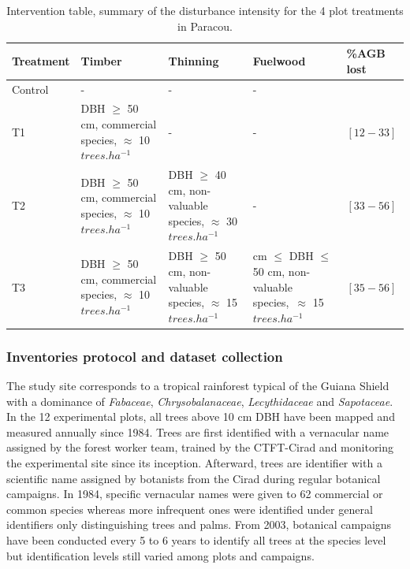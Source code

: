 \documentclass[
  11pt,
  french,
  A4paper,
  extrafontsizes,onecolumn,openright
  ]{memoir}
\begin{document}
\begin{longtable}[t]{>{\raggedright\arraybackslash}p{5em}|>{\raggedright\arraybackslash}p{8em}|>{\raggedright\arraybackslash}p{8em}|>{\raggedright\arraybackslash}p{11em}|>{\raggedright\arraybackslash}p{4em}}
\caption{\label{tab:Tab1}Intervention table, summary of the disturbance intensity for the 4 plot treatments in Paracou.}\\
\hline
Treatment & Timber & Thinning & Fuelwood & \%AGB lost\\
\hline
Control & - & - & - & 0\\
\hline
T1 & DBH $\geq$ 50 cm, commercial species, $\approx$ 10   $trees.ha^{-1}$ & - & - & $[12-33]$\\
\hline
T2 & DBH $\geq$ 50 cm, commercial species, $\approx$ 10  $trees.ha^{-1}$ & DBH $\geq$ 40 cm, non-valuable species, $\approx$ 30   $trees.ha^{-1}$ & - & $[33-56]$\\
\hline
T3 & DBH $\geq$ 50 cm, commercial species, $\approx$ 10  $trees.ha^{-1}$ & DBH $\geq$ 50 cm, non-valuable species, $\approx$ 15  $trees.ha^{-1}$ & 40 cm $\leq$ DBH $\leq$ 50 cm, non-valuable species,\ $\approx$ 15 $trees.ha^{-1}$ & $[35-56]$\\
\hline
\end{longtable}

\endgroup{}

\subsubsection{Inventories protocol and dataset
collection}\label{inventories-protocol-and-dataset-collection}

The study site corresponds to a tropical rainforest typical of the
Guiana Shield with a dominance of \emph{Fabaceae},
\emph{Chrysobalanaceae}, \emph{Lecythidaceae} and \emph{Sapotaceae}. In
the 12 experimental plots, all trees above 10 cm DBH have been mapped
and measured annually since 1984. Trees are first identified with a
vernacular name assigned by the forest worker team, trained by the
CTFT-Cirad and monitoring the experimental site since its inception.
Afterward, trees are identifier with a scientific name assigned by
botanists from the Cirad during regular botanical campaigns. In 1984,
specific vernacular names were given to 62 commercial or common species
whereas more infrequent ones were identified under general identifiers
only distinguishing trees and palms. From 2003, botanical campaigns have
been conducted every 5 to 6 years to identify all trees at the species
level but identification levels still varied among plots and campaigns.
\end{document}
